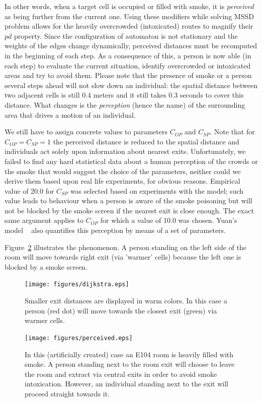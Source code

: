 In other words, when a target cell is occupied or filled with smoke, it is
\emph{perceived} as being further from the current one.
Using these modifiers while solving MSSD problem allows for the heavily 
overcrowded (intoxicated) routes to magnify their $pd$ property.
Since the configuration of automaton is not stationary and the weights of the
edges change dynamically, perceived distances must be recomputed in the
beginning of each step.
As a consequence of this, a person is now able (in each step) to evaluate the 
current situation, identify overcrowded or intoxicated areas and try to avoid
them. 
Please note that the presence of smoke or a person several steps ahead will not
slow down an individual: the spatial distance between two adjacent cells is
still 0.4 meters and it still takes 0.3 seconds to cover this distance.
What changes is the \emph{perception} (hence the name) of the surrounding area
that drives a motion of an individual.

We still have to assign concrete values to parameters $C_{OP}$ and $C_{SP}$.
Note that for $C_{OP} = C_{SP} = 1$ the perceived distance is reduced to the
spatial distance and individuals act solely upon information about nearest exits. 
Unfortunately, we failed to find any hard statistical data about a human
perception of the crowds or the smoke that would suggest the choice of the
parameters, neither could we derive them based upon real life experiments, for
obvious reasons. 
Empirical value of 20.0 for $C_{SP}$ was selected based on experiments with the 
model; such value leads to behaviour when a person is aware of the smoke
poisoning but will not be blocked by the smoke screen if the nearest exit is
close enough.
The exact same argument applies to $C_{OP}$ for which a value of 10.0 was chosen.
Yuan's model ~\cite{Yuan} also quantifies this perception by means of a set
of parameters.

Figure~\ref{fig:perceived} illustrates the phenomenon.
A person standing on the left side of the room will move
towards right exit (via 'warmer' cells) because the left one is blocked by a
smoke screen.

\begin{figure}
    \texttt{[image: figures/dijkstra.eps]}
    \caption{
        Smaller exit distances are displayed in warm colors.
        In this case a person (red dot) will move towards the closest exit
        (green) via warmer cells.
    }
    \label{fig:dijkstra}
\end{figure}

\begin{figure}
    \texttt{[image: figures/perceived.eps]}
    \caption{
        In this (artificially created) case an E104 room is heavily filled with
        smoke.
        A person standing next to the room exit will choose to leave the room
        and extract via central exits in order to avoid smoke intoxication.
        However, an individual standing next to the exit will proceed straight
        towards it.
    }
    \label{fig:perceived}
\end{figure}


